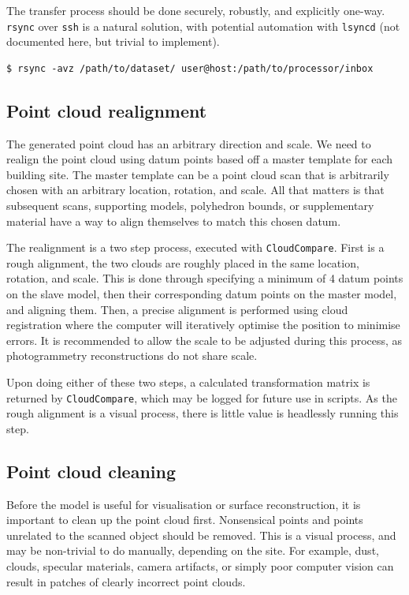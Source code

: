The transfer process should be done securely, robustly, and explicitly one-way. {\tt rsync} over {\tt ssh} is a natural solution, with potential automation with {\tt lsyncd} (not documented here, but trivial to implement).

\begin{lstlisting}
$ rsync -avz /path/to/dataset/ user@host:/path/to/processor/inbox
\end{lstlisting}

\subsection{Point cloud realignment}

The generated point cloud has an arbitrary direction and scale. We need to realign the point cloud using datum points based off a master template for each building site. The master template can be a point cloud scan that is arbitrarily chosen with an arbitrary location, rotation, and scale. All that matters is that subsequent scans, supporting models, polyhedron bounds, or supplementary material have a way to align themselves to match this chosen datum.

The realignment is a two step process, executed with {\tt CloudCompare}. First is a rough alignment, the two clouds are roughly placed in the same location, rotation, and scale. This is done through specifying a minimum of 4 datum points on the slave model, then their corresponding datum points on the master model, and aligning them. Then, a precise alignment is performed using cloud registration where the computer will iteratively optimise the position to minimise errors. It is recommended to allow the scale to be adjusted during this process, as photogrammetry reconstructions do not share scale.

Upon doing either of these two steps, a calculated transformation matrix is returned by {\tt CloudCompare}, which may be logged for future use in scripts. As the rough alignment is a visual process, there is little value is headlessly running this step.

\subsection{Point cloud cleaning}

Before the model is useful for visualisation or surface reconstruction, it is important to clean up the point cloud first. Nonsensical points and points unrelated to the scanned object should be removed. This is a visual process, and may be non-trivial to do manually, depending on the site. For example, dust, clouds, specular materials, camera artifacts, or simply poor computer vision can result in patches of clearly incorrect point clouds.

